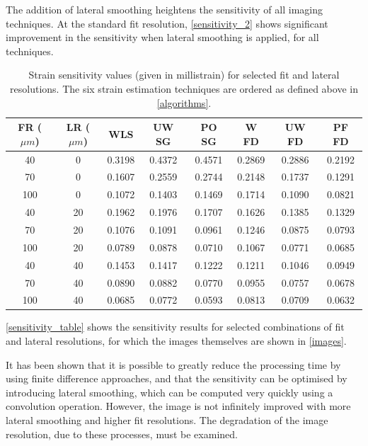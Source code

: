 The addition of lateral smoothing heightens the sensitivity of all imaging techniques. At the standard fit resolution, \autoref{sensitivity_2} shows significant improvement in the sensitivity when lateral smoothing is applied, for all techniques.

\begin{table}[h]
	\begin{center}
		\begin{tabular}{|c||c||c|c|c|c|c|c|}
			\hline 
			FR ($\mu m$) & LR ($\mu m$) & WLS & UW SG & PO SG & W FD & UW FD & PF FD \\
			\hline
			\hline
			40 & 0 & 0.3198 & 0.4372 & 0.4571 & 0.2869 & 0.2886 & 0.2192 \\
			\hline
			70 & 0 & 0.1607 & 0.2559 & 0.2744 & 0.2148 & 0.1737 & 0.1291 \\
			\hline
			100 & 0 & 0.1072 & 0.1403 & 0.1469 & 0.1714 & 0.1090 & 0.0821 \\
			\hline
			40 & 20 & 0.1962 & 0.1976 & 0.1707 & 0.1626 & 0.1385 & 0.1329 \\
			\hline
			70 & 20 & 0.1076 & 0.1091 & 0.0961 & 0.1246 & 0.0875 & 0.0793 \\
			\hline
			100 & 20 & 0.0789 & 0.0878 & 0.0710 & 0.1067 & 0.0771 & 0.0685 \\
			\hline
			40 & 40 & 0.1453 & 0.1417 & 0.1222 & 0.1211 & 0.1046 & 0.0949 \\
			\hline
			70 & 40 & 0.0890 & 0.0882 & 0.0770 & 0.0955 & 0.0757 & 0.0678 \\
			\hline
			100 & 40 & 0.0685 & 0.0772 & 0.0593 & 0.0813 & 0.0709 & 0.0632 \\
			\hline
		\end{tabular}
	\end{center}
	\caption{Strain sensitivity values (given in millistrain) for selected fit and lateral resolutions. The six strain estimation techniques are ordered as defined above in \autoref{algorithms}.}
	\label{sensitivity_table}
\end{table}

\autoref{sensitivity_table} shows the sensitivity results for selected combinations of fit and lateral resolutions, for which the images themselves are shown in \autoref{images}.

It has been shown that it is possible to greatly reduce the processing time by using finite difference approaches, and that the sensitivity can be optimised by introducing lateral smoothing, which can be computed very quickly using a convolution operation. However, the image is not infinitely improved with more lateral smoothing and higher fit resolutions. The degradation of the image resolution, due to these processes, must be examined. 

